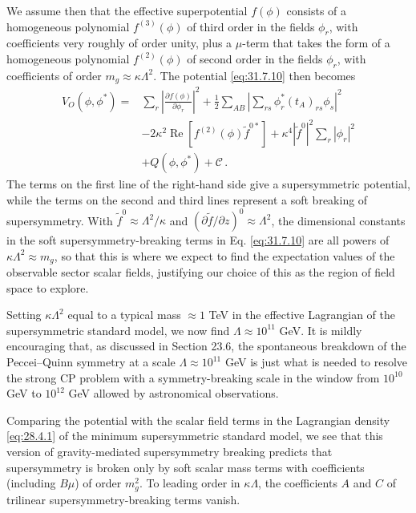 We assume then that the effective superpotential \(f(\phi)\) consists of a
homogeneous polynomial \(f^{(3)}(\phi)\) of third order in the fields
\(\phi_r\), with coefficients very roughly of order unity, plus a
\(\mu\)-term that takes the form of a homogeneous polynomial
\(f^{(2)}(\phi)\) of second order in the fields \(\phi_r\), with
coefficients of order \(m_g\approx\kappa\Lambda^2\). The potential
\eqref{eq:31.7.10} then becomes
\begin{equation}
  \begin{aligned}
  V_O(\phi,\phi^*)={}&
  \sum_r\left|\frac{\partial f(\phi)}{\partial\phi_r}\right|^2
  +\frac12\sum_{AB}\left|
    \sum_{rs}\phi_r^*(t_A)_{rs}\phi_s
  \right|^2
  \\
  &-2\kappa^2\operatorname{Re}
    \left[f^{(2)}(\phi)\widetilde f^{0*}\right]
  +\kappa^4|\widetilde f^0|^2\sum_r|\phi_r|^2
  \\
  &+Q(\phi,\phi^*)+\mathcal C\,.
  \end{aligned}
  \tag{31.7.11}\label{eq:31.7.11}
\end{equation}
The terms on the first line of the right-hand side give a supersymmetric
potential, while the terms on the second and third lines represent a soft
breaking of supersymmetry. With \(\widetilde f^0\approx\Lambda^2/\kappa\)
and \((\partial\widetilde f/\partial z)^0\approx\Lambda^2\), the dimensional
constants in the soft supersymmetry-breaking terms in
Eq. \eqref{eq:31.7.10} are all powers of
\(\kappa\Lambda^2\approx m_g\), so that this is where we expect to find the
expectation values of the observable sector scalar fields, justifying our
choice of this as the region of field space to explore.

Setting \(\kappa\Lambda^2\) equal to a typical mass \(\approx1\) TeV in the
effective Lagrangian of the supersymmetric standard model, we now find
\(\Lambda\approx10^{11}\) GeV. It is mildly encouraging that, as discussed
in Section 23.6, the spontaneous breakdown of the Peccei--Quinn symmetry at
a scale \(\Lambda\approx10^{11}\) GeV is just what is needed to resolve the
strong CP problem with a symmetry-breaking scale in the window from
\(10^{10}\) GeV to \(10^{12}\) GeV allowed by astronomical observations.

Comparing the potential with the scalar field terms in the Lagrangian
density \eqref{eq:28.4.1} of the minimum supersymmetric standard model, we
see that this version of gravity-mediated supersymmetry breaking predicts
that supersymmetry is broken only by soft scalar mass terms with
coefficients (including \(B\mu\)) of order \(m_g^2\). To leading order in
\(\kappa\Lambda\), the coefficients \(A\) and \(C\) of trilinear
supersymmetry-breaking terms vanish.

